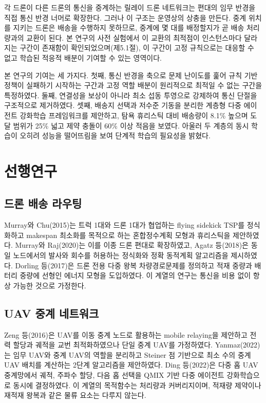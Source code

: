 \documentclass[12pt]{article}
\begin{document}
각 드론이 다른 드론의 통신을 중계하는 릴레이 드론 네트워크는 편대의 임무 반경을 직접 통신
반경 너머로 확장한다. 그러나 이 구조는 운영상의 상충을 만든다. 중계 위치를 지키는 드론은
배송을 수행하지 못하므로, 중계에 몇 대를 배정할지가 곧 배송 처리량과의 교환이 된다. 본 연구의
사전 실험에서 이 교환의 최적점이 인스턴스마다 달라지는 구간이 존재함이 확인되었으며(제5.1절),
이 구간이 고정 규칙으로는 대응할 수 없고 학습된 적응적 배분이 기여할 수 있는 영역이다.

본 연구의 기여는 세 가지다. 첫째, 통신 반경을 축으로 문제 난이도를 훑어 규칙 기반 정책이
실패하기 시작하는 구간과 고정 역할 배분이 원리적으로 최적일 수 없는 구간을 특정하였다.
둘째, 연결성을 보상이 아니라 최소 섭동 투영으로 강제하여 통신 단절을 구조적으로 제거하였다.
셋째, 배송지 선택과 저수준 기동을 분리한 계층형 다중 에이전트 강화학습 프레임워크를 제안하고,
탐욕 휴리스틱 대비 배송량이 8.1\% 높으며 도달 범위가 25\% 넓고 제약 충돌이 60\% 이상 적음을
보였다. 아울러 두 계층의 동시 학습이 오히려 성능을 떨어뜨림을 보여 단계적 학습의 필요성을 밝혔다.

\section{선행연구}

\subsection{드론 배송 라우팅}

Murray와 Chu(2015)는 트럭 1대와 드론 1대가 협업하는 flying sidekick TSP를 정식화하고 makespan
최소화를 목적으로 하는 혼합정수계획 모형과 휴리스틱을 제안하였다. Murray와 Raj(2020)는 이를
이종 드론 편대로 확장하였고, Agatz 등(2018)은 동일 노드에서의 발사와 회수를 허용하는 정식화와
정확 동적계획 알고리즘을 제시하였다. Dorling 등(2017)은 드론 전용 다중 왕복 차량경로문제를
정의하고 적재 중량과 배터리 중량에 선형인 에너지 모형을 도입하였다. 이 계열의 연구는 통신을
비용 없이 항상 가능한 것으로 가정한다.

\subsection{UAV 중계 네트워크}

Zeng 등(2016)은 UAV를 이동 중계 노드로 활용하는 mobile relaying을 제안하고 전력 할당과 궤적을
교번 최적화하였으나 단일 중계 UAV를 가정하였다. Yanmaz(2022)는 임무 UAV와 중계 UAV의 역할을
분리하고 Steiner 점 기반으로 최소 수의 중계 UAV 배치를 계산하는 2단계 알고리즘을 제안하였다.
Ding 등(2022)은 다중 홉 UAV 중계망에서 궤적, 주파수 할당, 다음 홉 선택을 QMIX 기반 다중 에이전트
강화학습으로 동시에 결정하였다. 이 계열의 목적함수는 처리량과 커버리지이며, 적재량 제약이나
재적재 왕복과 같은 물류 요소는 다루지 않는다.
\end{document}
